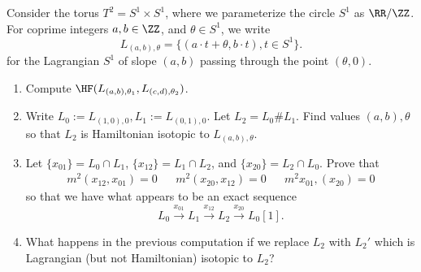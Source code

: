 
 
 
Consider the torus $T^2=S^1\times S^1$, where we parameterize the circle  $S^1$ as $\RR/\ZZ$. For coprime integers $a, b\in \ZZ$, and $\theta\in S^1$, we write 
\[L_{(a, b),\theta}=\{(a\cdot t+\theta,b\cdot t), t\in S^1\}.\]
for the Lagrangian $S^1$ of slope $(a, b)$ passing through the point $(\theta, 0)$. 
\begin{enumerate}
    \item Compute $\HF(L_{(a, b), \theta_1}, L_{(c, d), \theta_2})$.
    \item Write $L_0:=L_{(1,0), 0}, L_1:= L_{(0,1), 0}$. Let $L_2 = L_0\# L_1$. Find values $(a, b), \theta$ so that $L_2$ is Hamiltonian isotopic to $L_{(a, b), \theta}$.
    \item Let $\{x_{01}\}=L_0\cap L_1$, $\{x_{12}\}=L_1\cap L_2$, and $\{x_{20}\}=L_2\cap L_0$. Prove that 
    \begin{align*}
        m^2(x_{12}, x_{01})=0 && m^2(x_{20}, x_{12})=0 && m^2x_{01}, (x_{20})=0
    \end{align*}
    so that we have what appears to be an exact sequence 
    \[L_0\xrightarrow{x_{01}} L_1 \xrightarrow{x_{12}} L_2 \xrightarrow{x_{20}} L_0[1].\]
    \item What happens in the previous computation if we replace $L_2$ with $L_2'$ which is Lagrangian (but not Hamiltonian) isotopic to $L_2$?
\end{enumerate}



 